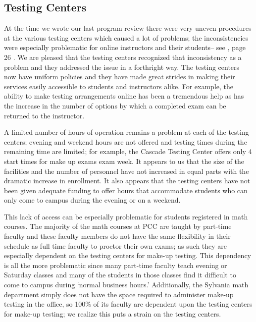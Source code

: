 
\subsection{Testing Centers}
At the time we wrote our last program review there were very uneven procedures
at the various testing centers which caused a lot of problems; the
inconsistencies were especially problematic for online instructors and their
students-- see \cite{mathprogramreview2003}, page 26 .  We are pleased that the testing centers recognized that
inconsistency as a problem and they addressed the issue in a forthright way.
The testing centers now have uniform policies and they have made great strides
in making their services easily accessible to students and instructors alike.
For example, the ability to make testing arrangements online has been a
tremendous help as has the increase in the number of options by which a
completed exam can be returned to the instructor.

A limited number of hours of operation remains a problem at each of the testing
centers;   evening and weekend hours are not offered and testing times during
the remaining time are limited; for example, the Cascade Testing Center 
offers only 4 start times for make up exams exam week.  It appears to us that the size of  the
facilities and the number of personnel  have not increased in equal parts with
the dramatic increase in enrollment.   It also appears that the testing centers
have not been given adequate funding to offer hours that accommodate students
who can only come to campus during the evening or on a weekend.

This lack of access can be especially problematic for students registered in
math courses.  The majority of the math courses at PCC are taught by part-time
faculty and these faculty members do not have the same flexibility in their
schedule as full time faculty to proctor their own exams; as such they are
especially dependent on the testing centers for make-up testing. This
dependency is all the more problematic since many part-time faculty teach
evening or Saturday classes and many of the students in those classes find it
difficult to come to campus during `normal business hours.' Additionally, the
Sylvania math department simply does not have the space required to
administer make-up testing in the office, so 100\% of its faculty are dependent
upon the testing centers for make-up testing;   we realize this puts a strain
on the testing centers. 

